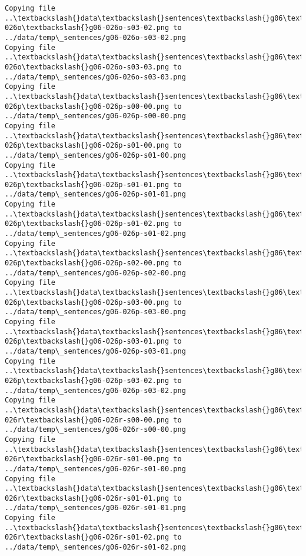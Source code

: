\documentclass[11pt]{article}
\begin{document}
\begin{Verbatim}[commandchars=\\\{\}]
Copying file ..\textbackslash{}data\textbackslash{}sentences\textbackslash{}g06\textbackslash{}g06-026o\textbackslash{}g06-026o-s03-02.png to
../data/temp\_sentences/g06-026o-s03-02.png
Copying file ..\textbackslash{}data\textbackslash{}sentences\textbackslash{}g06\textbackslash{}g06-026o\textbackslash{}g06-026o-s03-03.png to
../data/temp\_sentences/g06-026o-s03-03.png
Copying file ..\textbackslash{}data\textbackslash{}sentences\textbackslash{}g06\textbackslash{}g06-026p\textbackslash{}g06-026p-s00-00.png to
../data/temp\_sentences/g06-026p-s00-00.png
Copying file ..\textbackslash{}data\textbackslash{}sentences\textbackslash{}g06\textbackslash{}g06-026p\textbackslash{}g06-026p-s01-00.png to
../data/temp\_sentences/g06-026p-s01-00.png
Copying file ..\textbackslash{}data\textbackslash{}sentences\textbackslash{}g06\textbackslash{}g06-026p\textbackslash{}g06-026p-s01-01.png to
../data/temp\_sentences/g06-026p-s01-01.png
Copying file ..\textbackslash{}data\textbackslash{}sentences\textbackslash{}g06\textbackslash{}g06-026p\textbackslash{}g06-026p-s01-02.png to
../data/temp\_sentences/g06-026p-s01-02.png
Copying file ..\textbackslash{}data\textbackslash{}sentences\textbackslash{}g06\textbackslash{}g06-026p\textbackslash{}g06-026p-s02-00.png to
../data/temp\_sentences/g06-026p-s02-00.png
Copying file ..\textbackslash{}data\textbackslash{}sentences\textbackslash{}g06\textbackslash{}g06-026p\textbackslash{}g06-026p-s03-00.png to
../data/temp\_sentences/g06-026p-s03-00.png
Copying file ..\textbackslash{}data\textbackslash{}sentences\textbackslash{}g06\textbackslash{}g06-026p\textbackslash{}g06-026p-s03-01.png to
../data/temp\_sentences/g06-026p-s03-01.png
Copying file ..\textbackslash{}data\textbackslash{}sentences\textbackslash{}g06\textbackslash{}g06-026p\textbackslash{}g06-026p-s03-02.png to
../data/temp\_sentences/g06-026p-s03-02.png
Copying file ..\textbackslash{}data\textbackslash{}sentences\textbackslash{}g06\textbackslash{}g06-026r\textbackslash{}g06-026r-s00-00.png to
../data/temp\_sentences/g06-026r-s00-00.png
Copying file ..\textbackslash{}data\textbackslash{}sentences\textbackslash{}g06\textbackslash{}g06-026r\textbackslash{}g06-026r-s01-00.png to
../data/temp\_sentences/g06-026r-s01-00.png
Copying file ..\textbackslash{}data\textbackslash{}sentences\textbackslash{}g06\textbackslash{}g06-026r\textbackslash{}g06-026r-s01-01.png to
../data/temp\_sentences/g06-026r-s01-01.png
Copying file ..\textbackslash{}data\textbackslash{}sentences\textbackslash{}g06\textbackslash{}g06-026r\textbackslash{}g06-026r-s01-02.png to
../data/temp\_sentences/g06-026r-s01-02.png

\end{Verbatim}
\end{document}
